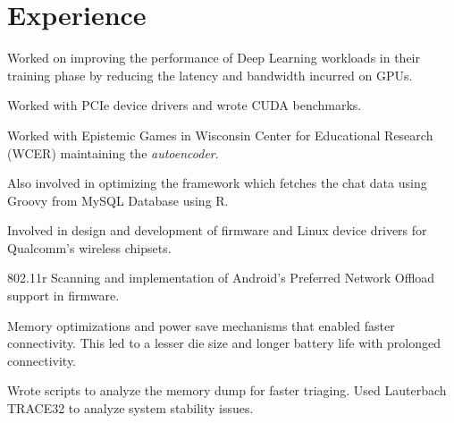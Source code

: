 \documentclass[letterpaper]{deedy-resume} %
\begin{document}
\begin{minipage}[t]{0.76\textwidth}
\section{Experience}

\begin{tightitemize}
\item Worked on improving the performance of Deep Learning workloads in their training phase by reducing the latency and bandwidth incurred on GPUs. 
\item Worked with PCIe device drivers and wrote CUDA benchmarks.
\end{tightitemize}

\begin{tightitemize}
\item Worked with Epistemic Games in Wisconsin Center for Educational Research (WCER) maintaining the \textit{autoencoder}.
\item Also involved in optimizing the framework which fetches the chat data using Groovy from MySQL Database using R.
\end{tightitemize}

\sectionspace %

\vspace{-1 mm} %
\begin{tightitemize}
\item Involved in design and development of firmware and Linux device drivers for Qualcomm's wireless chipsets.
\item 802.11r Scanning and implementation of Android’s Preferred Network Offload support in firmware.
\item Memory optimizations and power save mechanisms that enabled faster connectivity. This led to a lesser die size and longer battery life with prolonged connectivity.
\item  Wrote scripts to analyze the memory dump for faster triaging. Used Lauterbach TRACE32 to analyze system stability issues.

\end{tightitemize}


\end{minipage}
\end{document}
